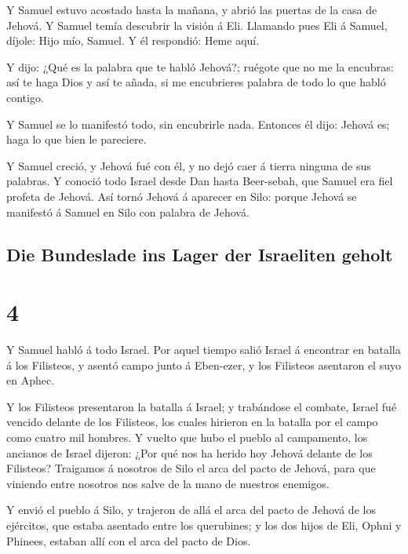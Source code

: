  Y Samuel estuvo acostado hasta la mañana, y abrió las
puertas de la casa de Jehová. Y Samuel temía descubrir la visión á Eli.
 Llamando pues Eli á Samuel, díjole: Hijo mío, Samuel. Y
él respondió: Heme aquí.

 Y dijo: ¿Qué es la palabra que te habló Jehová?; ruégote
que no me la encubras: así te haga Dios y así te añada, si me
encubrieres palabra de todo lo que habló contigo.

 Y Samuel se lo manifestó todo, sin encubrirle nada.
Entonces él dijo: Jehová es; haga lo que bien le pareciere.

 Y Samuel creció, y Jehová fué con él, y no dejó caer á
tierra ninguna de sus palabras.  Y conoció todo Israel
desde Dan hasta Beer-sebah, que Samuel era fiel profeta de Jehová.
 Así tornó Jehová á aparecer en Silo: porque Jehová se
manifestó á Samuel en Silo con palabra de Jehová.

\hypertarget{die-bundeslade-ins-lager-der-israeliten-geholt}{%
\subsection{Die Bundeslade ins Lager der Israeliten
geholt}\label{die-bundeslade-ins-lager-der-israeliten-geholt}}

\hypertarget{section-09-4}{%
\section{4}\label{section-09-4}}

 Y Samuel habló á todo Israel. Por aquel tiempo salió
Israel á encontrar en batalla á los Filisteos, y asentó campo junto á
Eben-ezer, y los Filisteos asentaron el suyo en Aphec.

 Y los Filisteos presentaron la batalla á Israel; y
trabándose el combate, Israel fué vencido delante de los Filisteos, los
cuales hirieron en la batalla por el campo como cuatro mil hombres.
 Y vuelto que hubo el pueblo al campamento, los ancianos
de Israel dijeron: ¿Por qué nos ha herido hoy Jehová delante de los
Filisteos? Traigamos á nosotros de Silo el arca del pacto de Jehová,
para que viniendo entre nosotros nos salve de la mano de nuestros
enemigos.

 Y envió el pueblo á Silo, y trajeron de allá el arca del
pacto de Jehová de los ejércitos, que estaba asentado entre los
querubines; y los dos hijos de Eli, Ophni y Phinees, estaban allí con el
arca del pacto de Dios.

